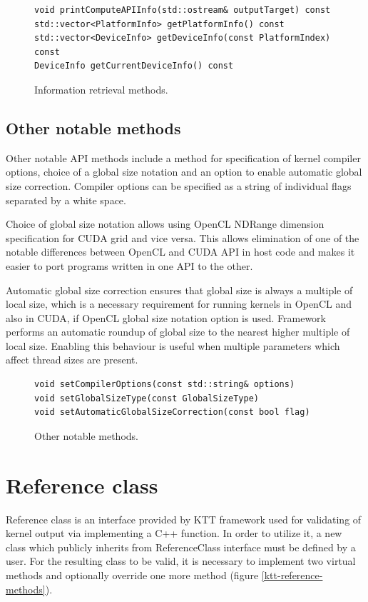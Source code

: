 \documentclass
[
    digital, %
    oneside, %
    table, %
    nolof, %
    nolot, %
    nocover %
]{fithesis3}
\begin{document}
\begin{figure}
\begin{lstlisting}
void printComputeAPIInfo(std::ostream& outputTarget) const
std::vector<PlatformInfo> getPlatformInfo() const
std::vector<DeviceInfo> getDeviceInfo(const PlatformIndex) const
DeviceInfo getCurrentDeviceInfo() const
\end{lstlisting}
\caption{Information retrieval methods.}
\label{ktt-information-methods}
\end{figure}

\subsection{Other notable methods}
Other notable API methods include a method for specification of kernel compiler options, choice of a global size notation and an option to enable
automatic global size correction. Compiler options can be specified as a string of individual flags separated by a white space.

Choice of global size notation allows using OpenCL NDRange dimension specification for CUDA grid and vice versa. This allows elimination of one of the
notable differences between OpenCL and CUDA API in host code and makes it easier to port programs written in one API to the other.

Automatic global size correction ensures that global size is always a multiple of local size, which is a necessary requirement for running kernels
in OpenCL and also in CUDA, if OpenCL global size notation option is used. Framework performs an automatic roundup of global size to the nearest higher
multiple of local size. Enabling this behaviour is useful when multiple parameters which affect thread sizes are present.

\begin{figure}
\begin{lstlisting}
void setCompilerOptions(const std::string& options)
void setGlobalSizeType(const GlobalSizeType)
void setAutomaticGlobalSizeCorrection(const bool flag)
\end{lstlisting}
\caption{Other notable methods.}
\label{ktt-utility-methods}
\end{figure}

\section{Reference class}
Reference class is an interface provided by KTT framework used for validating of kernel output via implementing a C++ function. In order to utilize it,
a new class which publicly inherits from ReferenceClass interface must be defined by a user. For the resulting class to be valid, it is necessary to
implement two virtual methods and optionally override one more method (figure \ref{ktt-reference-methods}).
\end{document}
